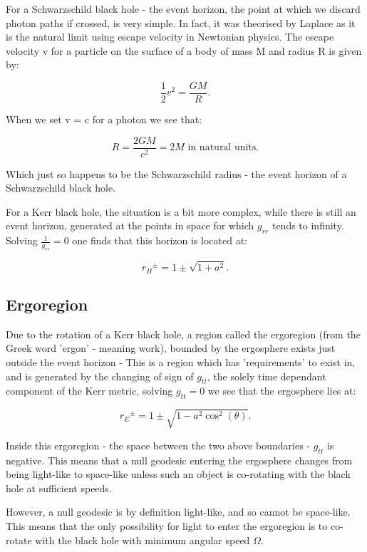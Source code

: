 \documentclass[oneside,openright,frontopenright, singlespacing]{dmathesis}
\begin{document}
	For a Schwarzschild black hole - the event horizon, the point at which we discard photon paths if crossed, is very simple. In fact, it was theorised by Laplace as it is the natural limit using escape velocity in Newtonian physics. The escape velocity v for a particle on the surface of a body of mass M and radius R is given by:

	\[\frac{1}{2}v^2 = \frac{GM}{R}.\]

\vspace{1em}
	When we set v = c for a photon we see that:

	\[R = \frac{2GM}{c^2} = 2M \mbox{ in natural units}.\]

\vspace{1em}
	Which just so happens to be the Schwarzschild radius - the event horizon of a Schwarzschild black hole.

\vspace{1em}
	For a Kerr black hole, the situation is a bit more complex, while there is still an event horizon, generated at the points in space for which $g_{rr}$ tends to infinity. Solving $\frac{1}{g_{rr}} = 0$ one finds that this horizon is located at:

	\[{r_{H}}^{\pm} = 1\pm\sqrt{1+a^2}.\]

\subsection{Ergoregion}\label{subsec:SubSection4.3.2}

	Due to the rotation of a Kerr black hole, a region called the ergoregion (from the Greek word 'ergon' - meaning work), bounded by the ergosphere exists just outside the event horizon - This is a region which has 'requirements' to exist in, and is generated by the changing of sign of $g_{tt}$, the solely time dependant component of the Kerr metric, solving $g_{tt} = 0$ we see that the ergosphere lies at:

	\[{r_{E}}^{\pm} = 1\pm\sqrt{1-a^2\cos^2(\theta)}.\]

\vspace{1em}
	Inside this ergoregion - the space between the two above boundaries - $g_{tt}$ is negative. This means that a null geodesic entering the ergosphere changes from being light-like to space-like unless such an object is co-rotating with the black hole at sufficient speeds.

\vspace{1em}
	However, a null geodesic is by definition light-like, and so cannot be space-like. This means that the only possibility for light to enter the ergoregion is to co-rotate with the black hole with minimum angular speed $\Omega$.
\end{document}
